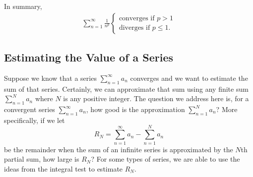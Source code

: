 \documentclass{report}
\begin{document}
In summary,
\begin{align}
\sum_{n=1}^{\infty} \frac{1}{n^p} \begin{cases}
\text{converges if } p>1 \\
\text{diverges if } p \leq 1.
\end{cases}
\end{align}

    \pagebreak 
    \subsection*{Estimating the Value of a Series}
    \bigbreak \noindent 
    Suppose we know that a series \( \sum_{n=1}^{\infty} a_n \)
converges and we want to estimate the sum of that series. Certainly, we can approximate that sum using any finite sum \( \sum_{n=1}^{N} a_n \)
where \( N \)
is any positive integer. The question we address here is, for a convergent series \( \sum_{n=1}^{\infty} a_n \),
how good is the approximation \( \sum_{n=1}^{N} a_n \)?
More specifically, if we let
\[ R_N = \sum_{n=1}^{\infty} a_n - \sum_{n=1}^{N} a_n \]
be the remainder when the sum of an infinite series is approximated by the \( N \)th
partial sum, how large is \( R_N \)?
For some types of series, we are able to use the ideas from the integral test to estimate \( R_N \).
    
\end{document}
